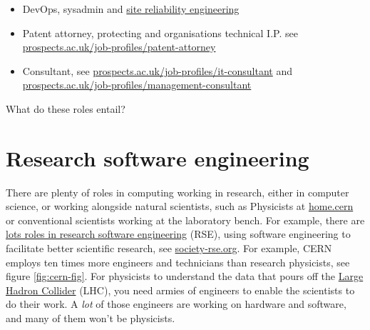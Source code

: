 \documentclass[
]{book}
\begin{document}
\begin{itemize}
\item
  DevOps, sysadmin and \href{https://en.wikipedia.org/wiki/Site_reliability_engineering}{site reliability engineering}
\item
  Patent attorney, protecting and organisations technical I.P. see \href{https://www.prospects.ac.uk/job-profiles/patent-attorney}{prospects.ac.uk/job-profiles/patent-attorney}
\item
  Consultant, see \href{https://www.prospects.ac.uk/job-profiles/it-consultant}{prospects.ac.uk/job-profiles/it-consultant} and \href{https://www.prospects.ac.uk/job-profiles/management-consultant}{prospects.ac.uk/job-profiles/management-consultant}
\end{itemize}

What do these roles entail?

\hypertarget{rse}{%
\section{Research software engineering}\label{rse}}

There are plenty of roles in computing working in research, either in computer science, or working alongside natural scientists, such as Physicists at \href{https://home.cern/}{home.cern} or conventional scientists working at the laboratory bench. For example, there are \href{https://dx.doi.org/10.1038/d41586-022-01516-2}{lots roles in research software engineering} (RSE), using software engineering to facilitate better scientific research, see \href{https://society-rse.org/}{society-rse.org}.\citep{rses} For example, CERN employs ten times more engineers and technicians than research physicists, see figure \ref{fig:cern-fig}. For physicists to understand the data that pours off the \href{https://en.wikipedia.org/wiki/Large_Hadron_Collider}{Large Hadron Collider} (LHC), you need armies of engineers to enable the scientists to do their work. A \emph{lot} of those engineers are working on hardware and software, and many of them won't be physicists. \citep{hullcern}
\end{document}
